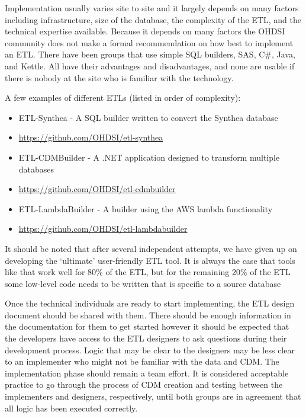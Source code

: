 \documentclass[11pt]{book}
\providecommand{\tightlist}{%
  \setlength{\itemsep}{0pt}\setlength{\parskip}{0pt}}
\theoremstyle{definition}
\theoremstyle{definition}
\theoremstyle{definition}
\theoremstyle{remark}
\begin{document}
Implementation usually varies site to site and it largely depends on
many factors including infrastructure, size of the database, the
complexity of the ETL, and the technical expertise available. Because it
depends on many factors the OHDSI community does not make a formal
recommendation on how best to implement an ETL. There have been groups
that use simple SQL builders, SAS, C\#, Java, and Kettle. All have their
advantages and disadvantages, and none are usable if there is nobody at
the site who is familiar with the technology.

A few examples of different ETLs (listed in order of
complexity):

\begin{itemize}
\tightlist
\item
  ETL-Synthea - A SQL builder written to convert the Synthea database
\item
  \url{https://github.com/OHDSI/etl-synthea}
\item
  ETL-CDMBuilder - A .NET application designed to transform multiple
  databases
\item
  \url{https://github.com/OHDSI/etl-cdmbuilder}
\item
  ETL-LambdaBuilder - A builder using the AWS lambda functionality
\item
  \url{https://github.com/OHDSI/etl-lambdabuilder}
\end{itemize}

It should be noted that after several independent attempts, we have
given up on developing the `ultimate' user-friendly ETL tool. It is
always the case that tools like that work well for 80\% of the ETL, but
for the remaining 20\% of the ETL some low-level code needs to be
written that is specific to a source database

Once the technical individuals are ready to start implementing, the ETL
design document should be shared with them. There should be enough
information in the documentation for them to get started however it
should be expected that the developers have access to the ETL designers
to ask questions during their development process. Logic that may be
clear to the designers may be less clear to an implementer who might not
be familiar with the data and CDM. The implementation phase should
remain a team effort. It is considered acceptable practice to go through
the process of CDM creation and testing between the implementers and
designers, respectively, until both groups are in agreement that all
logic has been executed correctly.
\end{document}
